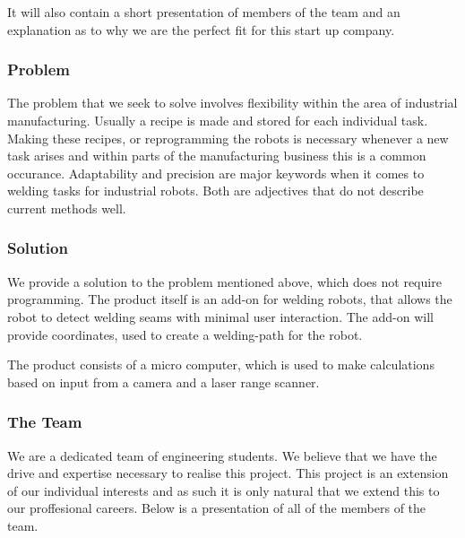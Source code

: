 It will also contain a short presentation of members of the team and an explanation as to why we are the perfect fit for this start up company.

\subsubsection{Problem}
The problem that we seek to solve involves flexibility within the area of industrial manufacturing. Usually a recipe is made and stored for each individual task.
Making these recipes, or reprogramming the robots is necessary whenever a new task arises and within parts of the manufacturing business this is a common occurance. 
Adaptability and precision are major keywords when it comes to welding tasks for industrial robots. Both are adjectives that do not describe current methods well.

\subsubsection{Solution}
We provide a solution to the problem mentioned above, which does not require programming. The product itself is an add-on for welding robots, that allows the robot to detect welding seams with minimal user interaction. The add-on will provide coordinates, used to create a welding-path for the robot. 

The product consists of a micro computer, which is used to make calculations based on input from a camera and a laser range scanner. 

\subsubsection{The Team}
We are a dedicated team of engineering students. We believe that we have the drive and expertise necessary to realise this project. This project is an extension of our individual interests and as such it is only natural that we extend this to our proffesional careers. Below is a presentation of all of the members of the team.

